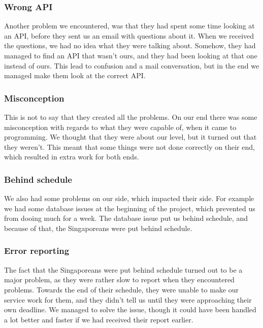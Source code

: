 \subsubsection{Wrong API}
\label{Collaboration_SMU_ConflictsAPI}
Another problem we encountered, was that they had spent some time looking at an API, before they sent us an email with questions about it. When we received the questions, we had no idea what they were talking about. Somehow, they had managed to find an API that wasn't ours, and they had been looking at that one instead of ours. This lead to confusion and a mail conversation, but in the end we managed make them look at the correct API.

\subsubsection{Misconception}
\label{Collaboration_SMU_ConflictsMisconception}
This is not to say that they created all the problems. On our end there was some misconception with regards to what they were capable of, when it came to programming. We thought that they were about our level, but it turned out that they weren't. This meant that some things were not done correctly on their end, which resulted in extra work for both ends.

\subsubsection{Behind schedule}
\label{Cooperation_schedule}
We also had some problems on our side, which impacted their side. For example we had some database issues at the beginning of the project, which prevented us from dooing much for a week. The database issue put us behind schedule, and because of that, the Singaporeans were put behind schedule.

\subsubsection{Error reporting}
\label{Cooperation_error}
The fact that the Singaporeans were put behind schedule turned out to be a major problem, as they were rather slow to report when they encountered problems. Towards the end of their schedule, they were unable to make our service work for them, and they didn't tell us until they were approaching their own deadline. We managed to solve the issue, though it could have been handled a lot better and faster if we had received their report earlier.

